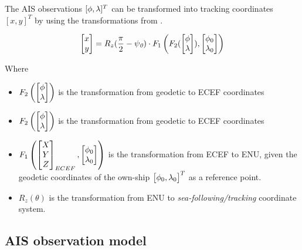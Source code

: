 The AIS observations $[{\phi}, {\lambda}]^{T}$ can be transformed into tracking coordinates $[x,y]^{T}$ by using the transformations from .


\begin{equation}
\begin{bmatrix}
x \\
y
\end{bmatrix} = R_z(\frac{\pi}{2}-{\psi}_{\textit{0}}) \cdot F_1\left(F_2(\begin{bmatrix}
{\phi} \\
{\lambda}
\end{bmatrix}),\begin{bmatrix}
{\phi}_0 \\ {\lambda}_0
\end{bmatrix}\right)
\end{equation}

Where

\begin{itemize}
	\item $F_2\left(\begin{bmatrix}
	{\phi} \\
	{\lambda}
	\end{bmatrix}\right)$ is the transformation from geodetic to ECEF coordinates
	\item $F_2\left(\begin{bmatrix}
	{\phi} \\
	{\lambda}
	\end{bmatrix}\right)$ is the transformation from geodetic to ECEF coordinates
	\item $F_1\left( \begin{bmatrix}
	X \\
	Y \\
	Z
	\end{bmatrix}_{ECEF},\begin{bmatrix}
	{\phi}_0 \\
	{\lambda}_0
	\end{bmatrix}\right)$ is the transformation from ECEF to ENU, given the geodetic coordinates of the own-ship $\begin{bmatrix}
	{\phi}_0,
	{\lambda}_0
	\end{bmatrix}^T$ as a reference point.
	\item $R_z(\theta)$ is the transformation from ENU to \emph{sea-following/tracking }coordinate system.
\end{itemize}

\subsection{AIS observation model}


